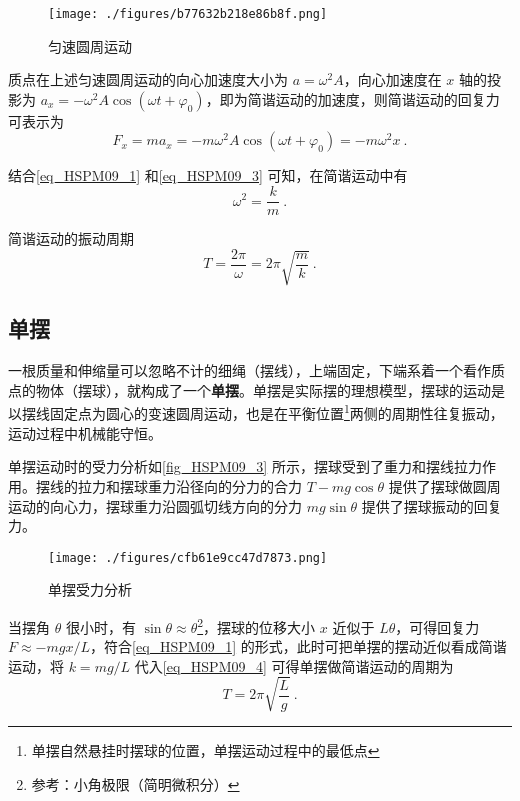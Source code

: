\begin{figure}[ht]
\centering
\texttt{[image: ./figures/b77632b218e86b8f.png]}
\caption{匀速圆周运动} \label{fig_HSPM09_4}
\end{figure}

质点在上述匀速圆周运动的向心加速度大小为 $a=\omega^2 A$，向心加速度在 $x$ 轴的投影为 $a_x=-\omega^2 A\cos(\omega t + \varphi_0)$，即为简谐运动的加速度，则简谐运动的回复力可表示为
\begin{equation}\label{eq_HSPM09_3}
F_x=ma_x=-m\omega^2 A\cos(\omega t + \varphi_0)= -m\omega^2 x~.
\end{equation}

结合\autoref{eq_HSPM09_1} 和\autoref{eq_HSPM09_3} 可知，在简谐运动中有
\begin{equation}
\omega^2=\frac km~.
\end{equation}

简谐运动的振动周期
\begin{equation}\label{eq_HSPM09_4}
T=\frac {2\pi}{\omega}=2\pi\sqrt{\frac mk}~.
\end{equation}


\subsection{单摆}

一根质量和伸缩量可以忽略不计的细绳（摆线），上端固定，下端系着一个看作质点的物体（摆球），就构成了一个\textbf{单摆}。单摆是实际摆的理想模型，摆球的运动是以摆线固定点为圆心的变速圆周运动，也是在平衡位置\footnote{单摆自然悬挂时摆球的位置，单摆运动过程中的最低点}两侧的周期性往复振动，运动过程中机械能守恒。

单摆运动时的受力分析如\autoref{fig_HSPM09_3} 所示，摆球受到了重力和摆线拉力作用。摆线的拉力和摆球重力沿径向的分力的合力 $T-mg\cos\theta$ 提供了摆球做圆周运动的向心力，摆球重力沿圆弧切线方向的分力 $mg\sin\theta$ 提供了摆球振动的回复力。

\begin{figure}[ht]
\centering
\texttt{[image: ./figures/cfb61e9cc47d7873.png]}
\caption{单摆受力分析} \label{fig_HSPM09_3}
\end{figure}

当摆角 $\theta$ 很小时，有 $\sin\theta \approx \theta$\footnote{参考：小角极限（简明微积分）}，摆球的位移大小 $x$ 近似于 $L\theta$，可得回复力 $F \approx -mgx/L$，符合\autoref{eq_HSPM09_1} 的形式，此时可把单摆的摆动近似看成简谐运动，将 $k=mg/L$ 代入\autoref{eq_HSPM09_4} 可得单摆做简谐运动的周期为
\begin{equation}
T=2\pi\sqrt{\frac Lg}~.
\end{equation}


